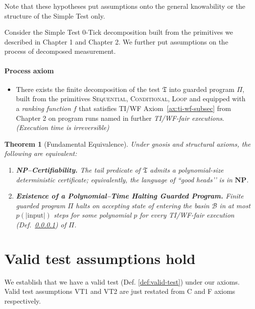 \documentclass[12pt]{article}
\theoremstyle{definition}
\theoremstyle{plain}
\newtheorem{theorem}{Theorem}[section]
\begin{document}
Note that these hypotheses put assumptions onto the general knowability or the structure of the Simple Test only.

Consider the Simple Test 0-Tick decomposition built from the primitives we described in Chapter 1 and Chapter 2. We further put assumptions on the process of decomposed measurement.
\paragraph{Process axiom}
\label{def:ti-wf-fair-execution}
\begin{itemize}
    \item[(I)] There exists the finite decomposition of the test $\mathfrak T$ into guarded program \(\Pi\), built from the primitives \textsc{Sequential}, \textsc{Conditional}, \textsc{Loop} and equipped with a \emph{ranking function} \(f\) that satisfies TI/WF Axiom~\ref{ax:ti-wf-subsec} from Chapter 2 on program runs named in further \emph{TI/WF-fair executions}. \emph{(Execution time is irreversible)}
\end{itemize}


\begin{theorem}[Fundamental Equivalence]
\label{thm:fundamental-equivalence-clean}
Under gnosis and structural axioms, the following are equivalent:

\begin{enumerate}[label=(\alph*), itemsep=4pt]
  \item \textbf{NP–Certifiability.}  
        The tail predicate of \(\mathfrak T\) admits a polynomial-size deterministic certificate; equivalently, the language of “good heads’’ is in \(\mathbf{NP}\).
  \item \textbf{Existence of a Polynomial–Time Halting Guarded Program.}          
        Finite guarded program \(\Pi\) halts on accepting state of entering the basin \(\mathcal B\) in at most \(p(|\mathrm{input}|)\) steps for some polynomial \(p\) for every TI/WF-fair execution (Def.~\ref{def:ti-wf-fair-execution}) of \(\Pi\).
\end{enumerate}
\end{theorem}

\section{Valid test assumptions hold}

We establish that we have a valid test (Def. \ref{def:valid-test}) under our axioms. Valid test assumptions VT1 and VT2 are just restated from C and F axioms respectively.
\end{document}

